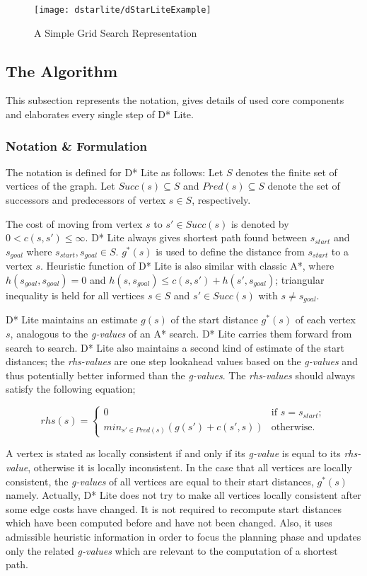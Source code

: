 \begin{figure}
\centering
\texttt{[image: dstarlite/dStarLiteExample]}
\caption{A Simple Grid Search Representation}
\label{fig:dStarLiteExample}
\end{figure}

\subsection{The Algorithm}

This subsection represents the notation, gives details of used core components and elaborates every single step of D* Lite.

\subsubsection{Notation \& Formulation}
The notation is defined for D* Lite as follows: Let $S$ denotes the finite set of vertices of the graph. Let $Succ(s) \subseteq S$ and $Pred(s) \subseteq S$ denote the set of successors and predecessors of vertex $s \in S$, respectively. 

The cost of moving from vertex $s$ to $s' \in Succ(s)$ is denoted by $0 < c(s, s') \leq \infty$. D* Lite always gives shortest path found between $s_{start}$ and $s_{goal}$ where $s_{start}, s_{goal} \in S$. $g^*(s)$ is used to define the distance from $s_{start}$ to a vertex $s$. Heuristic function of D* Lite is also similar with classic A*, where $h(s_{goal}, s_{goal}) = 0$ and $h(s, s_{goal}) \leq c(s, s') + h(s', s_{goal})$; triangular inequality is held for all vertices $s \in S$ and $s' \in Succ(s)$ with $s \neq s_{goal}$.

D* Lite maintains an estimate $g(s)$ of the start distance $g^*(s)$ of each vertex $s$, analogous to the \textit{g-values} of an A* search. D* Lite carries them forward from search to search. D* Lite also maintains a second kind of estimate of the start distances; the \textit{rhs-values} are one step lookahead values based on the \textit{g-values} and thus potentially better informed than the \textit{g-values}. The \textit{rhs-values} should always satisfy the following equation;

\[ rhs(s) = \left\{ \begin{array}{cc}
0 & \mbox{if $s=s_{start}$};\\
min_{s' \in Pred(s)}(g(s') + c(s', s)) & \mbox{otherwise}.\end{array} \right. \] 

A vertex is stated as locally consistent if and only if its \textit{g-value} is equal to its \textit{rhs-value}, otherwise it is locally inconsistent. In the case that all vertices are locally consistent, the \textit{g-values} of all vertices are equal to their start distances, $g^*(s)$ namely. Actually, D* Lite does not try to make all vertices locally consistent after some edge costs have changed. It is not required to recompute start distances which have been computed before and have not been changed. Also, it uses admissible heuristic information in order to focus the planning phase and updates only the related \textit{g-values} which are relevant to the computation of a shortest path.

